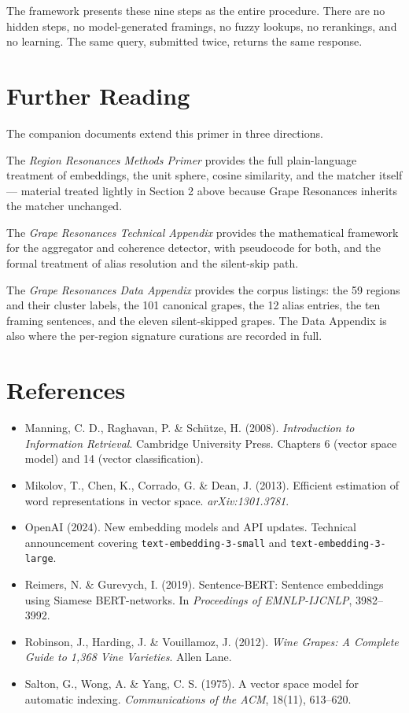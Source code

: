 \documentclass[11pt]{article}
\begin{document}
The framework presents these nine steps as the entire procedure. There are no hidden steps, no model-generated framings, no fuzzy lookups, no rerankings, and no learning. The same query, submitted twice, returns the same response.

\section*{Further Reading}

The companion documents extend this primer in three directions.

The \emph{Region Resonances Methods Primer} provides the full plain-language treatment of embeddings, the unit sphere, cosine similarity, and the matcher itself --- material treated lightly in Section 2 above because Grape Resonances inherits the matcher unchanged.

The \emph{Grape Resonances Technical Appendix} provides the mathematical framework for the aggregator and coherence detector, with pseudocode for both, and the formal treatment of alias resolution and the silent-skip path.

The \emph{Grape Resonances Data Appendix} provides the corpus listings: the 59 regions and their cluster labels, the 101 canonical grapes, the 12 alias entries, the ten framing sentences, and the eleven silent-skipped grapes. The Data Appendix is also where the per-region signature curations are recorded in full.

\section*{References}

\begin{itemize}[leftmargin=2em,itemsep=0.2em]
\item Manning, C. D., Raghavan, P. \& Sch\"utze, H. (2008). \emph{Introduction to Information Retrieval}. Cambridge University Press. Chapters 6 (vector space model) and 14 (vector classification).
\item Mikolov, T., Chen, K., Corrado, G. \& Dean, J. (2013). Efficient estimation of word representations in vector space. \emph{arXiv:1301.3781}.
\item OpenAI (2024). New embedding models and API updates. Technical announcement covering \texttt{text-embedding-3-small} and \texttt{text-embedding-3-large}.
\item Reimers, N. \& Gurevych, I. (2019). Sentence-BERT: Sentence embeddings using Siamese BERT-networks. In \emph{Proceedings of EMNLP-IJCNLP}, 3982--3992.
\item Robinson, J., Harding, J. \& Vouillamoz, J. (2012). \emph{Wine Grapes: A Complete Guide to 1,368 Vine Varieties}. Allen Lane.
\item Salton, G., Wong, A. \& Yang, C. S. (1975). A vector space model for automatic indexing. \emph{Communications of the ACM}, 18(11), 613--620.
\end{itemize}
\end{document}
